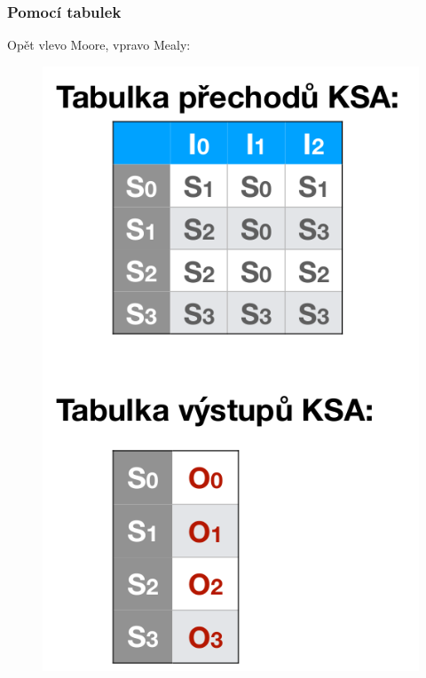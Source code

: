 \subsubsection{Pomocí tabulek}
Opět vlevo Moore, vpravo Mealy:\\
\begin{figure}[h!]
    \centering
    \begin{minipage}[b]{0.4\textwidth}
        \includegraphics[scale = 0.2]{img/MooreTabulky.png}
    \end{minipage}
    \hfill
    \begin{minipage}[b]{0.4\textwidth}

\end{minipage}
\end{figure}
